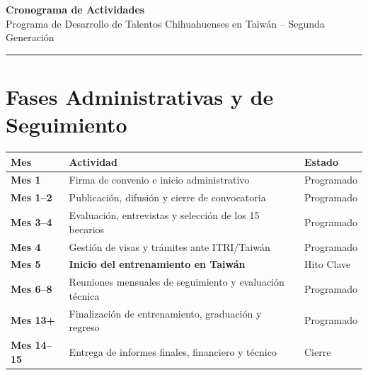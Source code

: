 \documentclass[11pt,letterpaper]{article}
\begin{document}
\begin{center}
    {\Huge \textbf{\textcolor{primary}{Cronograma de Actividades}}} \\
    \vspace{2mm}
    {\large Programa de Desarrollo de Talentos Chihuahuenses en Taiwán – Segunda Generación} \\
    \vspace{4mm}
    \rule{\textwidth}{0.4pt}
\end{center}

\section{Fases Administrativas y de Seguimiento}
\begin{tabularx}{\textwidth}{@{} l X l @{}}
    \toprule
    \textbf{Mes} & \textbf{Actividad} & \textbf{Estado} \\
    \midrule
    \textbf{Mes 1} & Firma de convenio e inicio administrativo & Programado \\
    \textbf{Mes 1--2} & Publicación, difusión y cierre de convocatoria & Programado \\
    \textbf{Mes 3--4} & Evaluación, entrevistas y selección de los 15 becarios & Programado \\
    \textbf{Mes 4} & Gestión de visas y trámites ante ITRI/Taiwán & Programado \\
    \textbf{Mes 5} & \textbf{Inicio del entrenamiento en Taiwán} & Hito Clave \\
    \textbf{Mes 6--8} & Reuniones mensuales de seguimiento y evaluación técnica & Programado \\
    \textbf{Mes 13+} & Finalización de entrenamiento, graduación y regreso & Programado \\
    \textbf{Mes 14--15} & Entrega de informes finales, financiero y técnico & Cierre \\
    \bottomrule
\end{tabularx}
\end{document}
